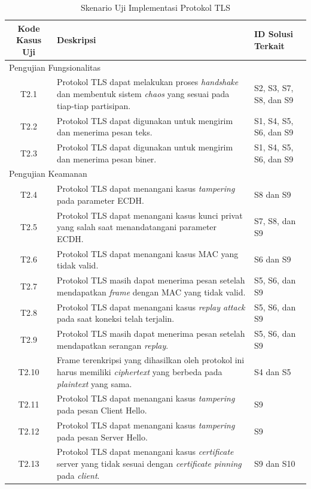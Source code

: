 \begin{table}[!h]
  \centering
  \caption{Skenario Uji Implementasi Protokol TLS} \label{tab:test.case.tls}
  \begin{tabular}{|c|p{7cm}|p{3cm}|}
    \hline
    Kode Kasus Uji & Deskripsi & ID Solusi Terkait \\ \hline
    \multicolumn{3}{|l|}{Pengujian Fungsionalitas} \\ \hline
    T2.1 & Protokol TLS dapat melakukan proses \emph{handshake} dan membentuk sistem \emph{chaos} yang sesuai pada tiap-tiap partisipan. & S2, S3, S7, S8, dan S9\\ \hline
    T2.2 & Protokol TLS dapat digunakan untuk mengirim dan menerima pesan teks. & S1, S4, S5, S6, dan S9 \\ \hline
    T2.3 & Protokol TLS dapat digunakan untuk mengirim dan menerima pesan biner. & S1, S4, S5, S6, dan S9 \\ \hline
    \multicolumn{3}{|l|}{Pengujian Keamanan} \\ \hline
    T2.4 & Protokol TLS dapat menangani kasus \emph{tampering} pada parameter ECDH. & S8 dan S9 \\ \hline
    T2.5 & Protokol TLS dapat menangani kasus kunci privat yang salah saat menandatangani parameter ECDH.  & S7, S8, dan S9 \\ \hline
    T2.6 & Protokol TLS dapat menangani kasus MAC yang tidak valid. & S6 dan S9 \\ \hline
    T2.7 & Protokol TLS masih dapat menerima pesan setelah mendapatkan \emph{frame} dengan MAC yang tidak valid.  & S5, S6, dan S9 \\ \hline
    T2.8 & Protokol TLS dapat menangani kasus \emph{replay attack} pada saat koneksi telah terjalin. & S5, S6, dan S9 \\ \hline
    T2.9 & Protokol TLS masih dapat menerima pesan setelah mendapatkan serangan \emph{replay}. & S5, S6, dan S9 \\ \hline
    T2.10 & Frame terenkripsi yang dihasilkan oleh protokol ini harus memiliki \emph{ciphertext} yang berbeda pada \emph{plaintext} yang sama. & S4 dan S5 \\ \hline
    T2.11 & Protokol TLS dapat menangani kasus \emph{tampering} pada pesan Client Hello. & S9 \\ \hline
    T2.12 & Protokol TLS dapat menangani kasus \emph{tampering} pada pesan Server Hello. & S9 \\ \hline
    T2.13 & Protokol TLS dapat menangani kasus \emph{certificate} server yang tidak sesuai dengan \emph{certificate pinning} pada \emph{client}.  & S9 dan S10 \\ \hline
  \end{tabular}
\end{table}


